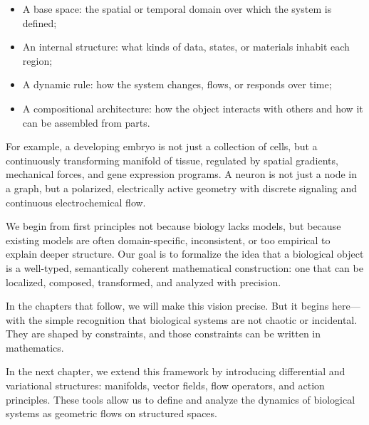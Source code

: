 \begin{itemize}
  \item A base space: the spatial or temporal domain over which the system is defined;
  \item An internal structure: what kinds of data, states, or materials inhabit each region;
  \item A dynamic rule: how the system changes, flows, or responds over time;
  \item A compositional architecture: how the object interacts with others and how it can be assembled from parts.
\end{itemize}

For example, a developing embryo is not just a collection of cells, but a continuously transforming manifold of tissue, regulated by spatial gradients, mechanical forces, and gene expression programs. A neuron is not just a node in a graph, but a polarized, electrically active geometry with discrete signaling and continuous electrochemical flow.

We begin from first principles not because biology lacks models, but because existing models are often domain-specific, inconsistent, or too empirical to explain deeper structure. Our goal is to formalize the idea that a biological object is a well-typed, semantically coherent mathematical construction: one that can be localized, composed, transformed, and analyzed with precision.

In the chapters that follow, we will make this vision precise. But it begins here—with the simple recognition that biological systems are not chaotic or incidental. They are shaped by constraints, and those constraints can be written in mathematics.



\medskip

In the next chapter, we extend this framework by introducing differential and variational structures: manifolds, vector fields, flow operators, and action principles. These tools allow us to define and analyze the dynamics of biological systems as geometric flows on structured spaces.

